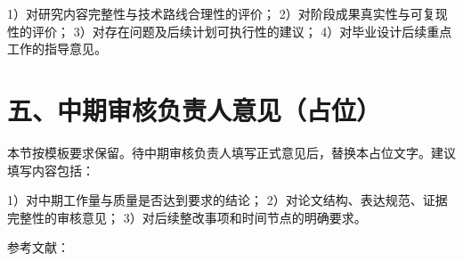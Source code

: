 \documentclass[UTF8,12pt,fontset=fandol]{ctexart}
\begin{document}
1）对研究内容完整性与技术路线合理性的评价；
2）对阶段成果真实性与可复现性的评价；
3）对存在问题及后续计划可执行性的建议；
4）对毕业设计后续重点工作的指导意见。

\section*{五、中期审核负责人意见（占位）}
本节按模板要求保留。待中期审核负责人填写正式意见后，替换本占位文字。建议填写内容包括：

1）对中期工作量与质量是否达到要求的结论；
2）对论文结构、表达规范、证据完整性的审核意见；
3）对后续整改事项和时间节点的明确要求。

\vspace{1.2em}

\noindent 参考文献：


\end{document}
